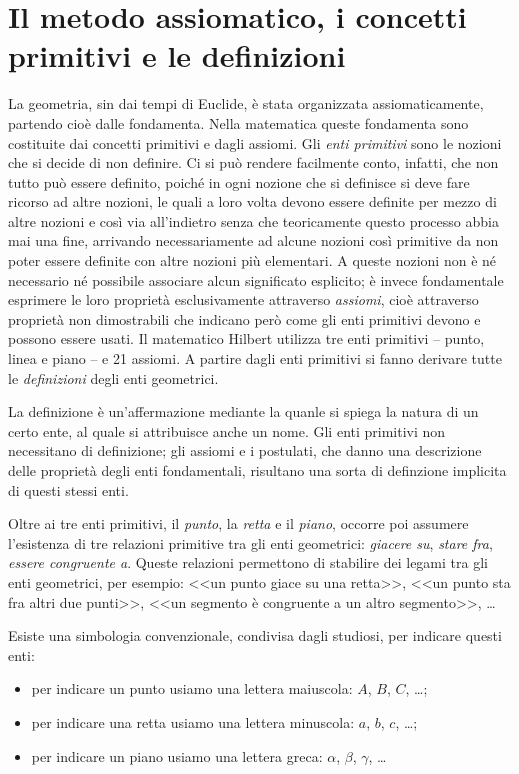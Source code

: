 \section{Il metodo assiomatico, i concetti primitivi e le 
definizioni}\label{sect:metodo_assiomatico_concetti_primitivi}
La geometria, sin dai tempi di Euclide, è stata organizzata 
assiomaticamente, partendo cioè dalle fondamenta. Nella matematica 
queste fondamenta sono costituite dai concetti primitivi e dagli 
assiomi. Gli \emph{enti primitivi} sono le nozioni che si decide di 
non definire. Ci si può rendere facilmente conto, infatti, che non 
tutto può essere definito, poiché in ogni nozione che si definisce si 
deve fare ricorso ad altre nozioni, le quali a loro volta devono 
essere definite per mezzo di altre nozioni e così via all'indietro 
senza che teoricamente questo processo abbia mai una fine, arrivando 
necessariamente ad alcune nozioni così primitive da non poter essere 
definite con altre nozioni più elementari. A queste nozioni non è né 
necessario né possibile associare alcun significato esplicito; è 
invece fondamentale esprimere le loro proprietà esclusivamente 
attraverso \emph{assiomi}, cioè attraverso proprietà non dimostrabili 
che indicano però come gli enti primitivi devono e possono essere 
usati. Il matematico Hilbert utilizza tre enti primitivi -- punto, 
linea e piano -- e 21 assiomi. A partire dagli enti primitivi si 
fanno derivare tutte le \emph{definizioni} degli enti geometrici.

La definizione è un'affermazione mediante la quanle si spiega la natura di un 
certo ente, al quale si attribuisce anche un nome. Gli enti primitivi non 
necessitano di definizione; gli assiomi e i postulati, che danno una 
descrizione delle proprietà degli enti fondamentali, risultano una sorta di 
definzione implicita di questi stessi enti.

Oltre ai tre enti primitivi, il \emph{punto}, la 
\emph{retta} e il \emph{piano}, occorre poi assumere l'esistenza di 
tre relazioni primitive tra gli enti geometrici: \emph{giacere su}, 
\emph{stare fra}, \emph{essere congruente a}. Queste relazioni 
permettono di stabilire dei legami tra gli enti geometrici, per 
esempio: <<un punto giace su una retta>>, <<un punto sta fra altri 
due punti>>, <<un segmento è congruente a un altro segmento>>, \ldots

Esiste una simbologia convenzionale, condivisa dagli studiosi, per 
indicare questi enti:
\begin{itemize}
\item per indicare un punto usiamo una lettera maiuscola: $A$, $B$, 
$C$, \ldots;
\item per indicare una retta usiamo una lettera minuscola: $a$, $b$, 
$c$, \ldots;
\item per indicare un piano usiamo una lettera greca: $\alpha$, 
$\beta$, $\gamma$, \ldots
\end{itemize}

